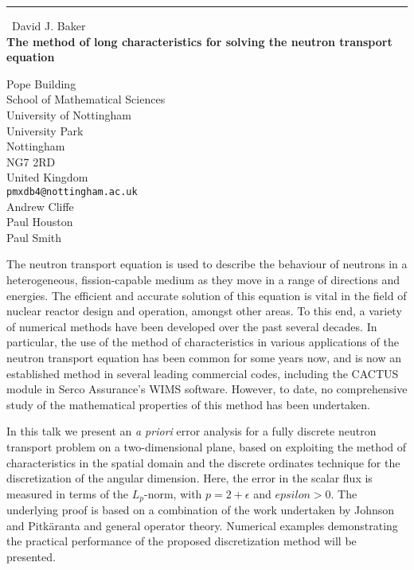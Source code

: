 \documentclass{report}
\begin{document}
\begin{center}
\rule{6in}{1pt} \
{\large David J. Baker \\
{\bf The method of long characteristics for solving the neutron transport equation}}

Pope Building \\ School of Mathematical Sciences \\ University of Nottingham \\ University Park \\ Nottingham \\ NG7 2RD \\ United Kingdom
\\
{\tt pmxdb4@nottingham.ac.uk}\\
Andrew Cliffe\\
Paul Houston\\
Paul Smith\end{center}

The neutron transport equation is used to describe the behaviour of
neutrons in a heterogeneous, fission-capable medium as they move in a
range of directions and energies. The efficient and accurate solution of
this equation is vital in the field of nuclear reactor design and
operation, amongst other areas. To this end, a variety of numerical
methods have been developed over the past several decades. In particular,
the use of the method of characteristics in various applications of the
neutron transport equation has been common for some years now, and is now
an established method in several leading commercial codes, including the
CACTUS module in Serco Assurance's WIMS software. However, to date, no
comprehensive study of the mathematical properties of this method has
been undertaken.

In this talk we present an \emph{a priori} error analysis for a fully
discrete neutron transport problem on a two-dimensional plane, based on
exploiting the method of characteristics in the spatial domain and the
discrete ordinates technique for the discretization of the angular
dimension. Here, the error in the scalar flux is measured in terms of the
$L_{p}$-norm, with $p = 2+\epsilon$ and $epsilon>0$. The underlying proof
is based on a combination of the work undertaken by Johnson and
Pitk{\"a}ranta and general operator theory. Numerical examples
demonstrating the practical performance of the proposed discretization
method will be presented.
\end{document}
